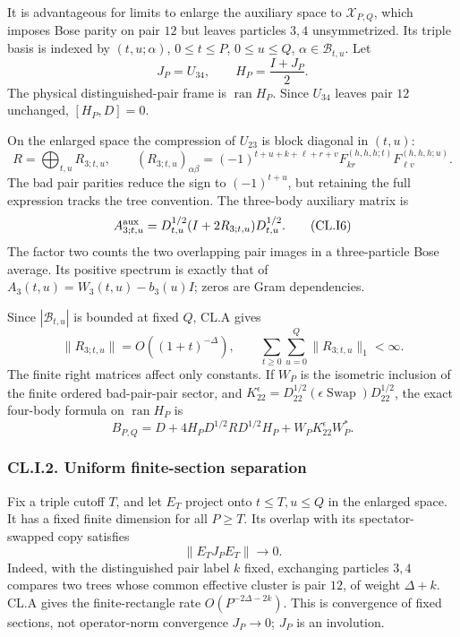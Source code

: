 \documentclass[a4paper,11pt]{article}
\numberwithin{equation}{section}
\begin{document}
It is advantageous for limits to enlarge the auxiliary space to \(\mathcal X_{P,Q}\), which imposes Bose parity on pair \(12\) but leaves particles \(3,4\) unsymmetrized. Its triple basis is indexed by \((t,u;\alpha)\), \(0\leq t\leq P\), \(0\leq u\leq Q\), \(\alpha\in\mathcal B_{t,u}\). Let \[
J_P=U_{34},\qquad H_P=\frac{I+J_P}{2}.
\] The physical distinguished-pair frame is \(\operatorname{ran}H_P\). Since \(U_{34}\) leaves pair \(12\) unchanged, \([H_P,D]=0\).

On the enlarged space the compression of \(U_{23}\) is block diagonal in \((t,u)\): \[
R=\bigoplus_{t,u}R_{3;t,u},\qquad
(R_{3;t,u})_{\alpha\beta}
=(-1)^{t+u+k+\ell+r+v}
F_{kr}^{(h,h,h;t)}F_{\ell v}^{(h,h,h;u)}.
\tag{CL.I5}
\] The bad pair parities reduce the sign to \((-1)^{t+u}\), but retaining the full expression tracks the tree convention. The three-body auxiliary matrix is \[
A_{3;t,u}^{\rm aux}
=D_{t,u}^{1/2}(I+2R_{3;t,u})D_{t,u}^{1/2}.
\tag{CL.I6}
\] The factor two counts the two overlapping pair images in a three-particle Bose average. Its positive spectrum is exactly that of \(A_3(t,u)=W_3(t,u)-b_3(u)I\); zeros are Gram dependencies.

Since \(|\mathcal B_{t,u}|\) is bounded at fixed \(Q\), CL.A gives \[
\|R_{3;t,u}\|=O((1+t)^{-\Delta}),\qquad
\sum_{t\geq0}\sum_{u=0}^Q\|R_{3;t,u}\|_1<\infty.
\tag{CL.I7}
\] The finite right matrices affect only constants. If \(W_P\) is the isometric inclusion of the finite ordered bad-pair-pair sector, and \(K_{22}^\epsilon=D_{22}^{1/2}(\epsilon\operatorname{Swap})D_{22}^{1/2}\), the exact four-body formula on \(\operatorname{ran}H_P\) is \[
B_{P,Q}
=D+4H_PD^{1/2}RD^{1/2}H_P+W_PK_{22}^{\epsilon}W_P^*.
\tag{CL.I8}
\]

\hypertarget{cl.i.2.-uniform-finite-section-separation}{%
\subsubsection{CL.I.2. Uniform finite-section separation}\label{cl.i.2.-uniform-finite-section-separation}}

Fix a triple cutoff \(T\), and let \(E_T\) project onto \(t\leq T,u\leq Q\) in the enlarged space. It has a fixed finite dimension for all \(P\geq T\). Its overlap with its spectator-swapped copy satisfies \[
\|E_TJ_PE_T\|\longrightarrow0.
\tag{CL.I9}
\] Indeed, with the distinguished pair label \(k\) fixed, exchanging particles \(3,4\) compares two trees whose common effective cluster is pair \(12\), of weight \(\Delta+k\). CL.A gives the finite-rectangle rate \(O(P^{-2\Delta-2k})\). This is convergence of fixed sections, not operator-norm convergence \(J_P\to0\); \(J_P\) is an involution.
\end{document}
